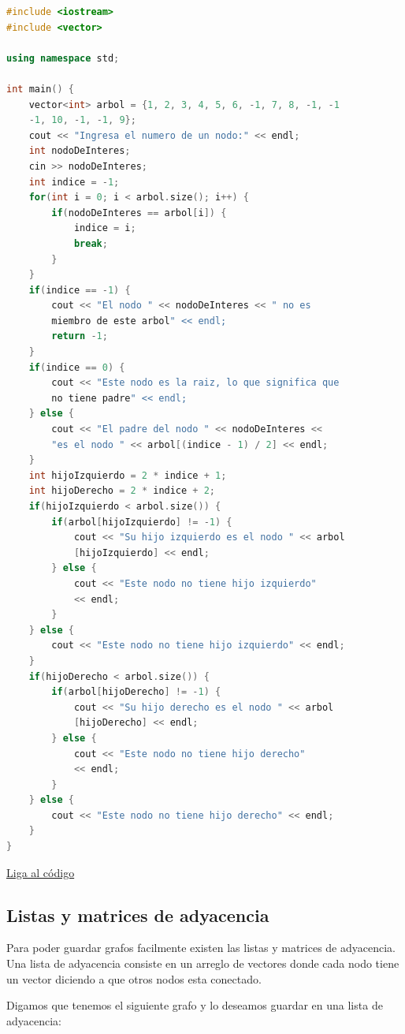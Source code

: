 \documentclass{article}
\begin{document}
\begin{lstlisting}[language=C++, caption=Arbol de binario]
#include <iostream>
#include <vector>

using namespace std;

int main() {
    vector<int> arbol = {1, 2, 3, 4, 5, 6, -1, 7, 8, -1, -1
    -1, 10, -1, -1, 9};
    cout << "Ingresa el numero de un nodo:" << endl;
    int nodoDeInteres;
    cin >> nodoDeInteres;
    int indice = -1;
    for(int i = 0; i < arbol.size(); i++) {
        if(nodoDeInteres == arbol[i]) {
            indice = i;
            break;
        }
    }
    if(indice == -1) {
        cout << "El nodo " << nodoDeInteres << " no es
        miembro de este arbol" << endl;
        return -1;
    }
    if(indice == 0) {
        cout << "Este nodo es la raiz, lo que significa que
        no tiene padre" << endl;
    } else {
        cout << "El padre del nodo " << nodoDeInteres <<
        "es el nodo " << arbol[(indice - 1) / 2] << endl;
    }
    int hijoIzquierdo = 2 * indice + 1;
    int hijoDerecho = 2 * indice + 2;
    if(hijoIzquierdo < arbol.size()) {
        if(arbol[hijoIzquierdo] != -1) {
            cout << "Su hijo izquierdo es el nodo " << arbol
            [hijoIzquierdo] << endl;
        } else {
            cout << "Este nodo no tiene hijo izquierdo"
            << endl;
        }
    } else {
        cout << "Este nodo no tiene hijo izquierdo" << endl;
    }
    if(hijoDerecho < arbol.size()) {
        if(arbol[hijoDerecho] != -1) {
            cout << "Su hijo derecho es el nodo " << arbol
            [hijoDerecho] << endl;
        } else {
            cout << "Este nodo no tiene hijo derecho"
            << endl;
        }
    } else {
        cout << "Este nodo no tiene hijo derecho" << endl;
    }
}
\end{lstlisting}
\href{https://repl.it/@Jamesscn/Arboles-Binarios}{Liga al código}

\subsection{Listas y matrices de adyacencia}

Para poder guardar grafos facilmente existen las listas y matrices de adyacencia. Una lista de adyacencia consiste en un arreglo de vectores donde cada nodo tiene un vector diciendo a que otros nodos esta conectado.

Digamos que tenemos el siguiente grafo y lo deseamos guardar en una lista de adyacencia:
\end{document}

